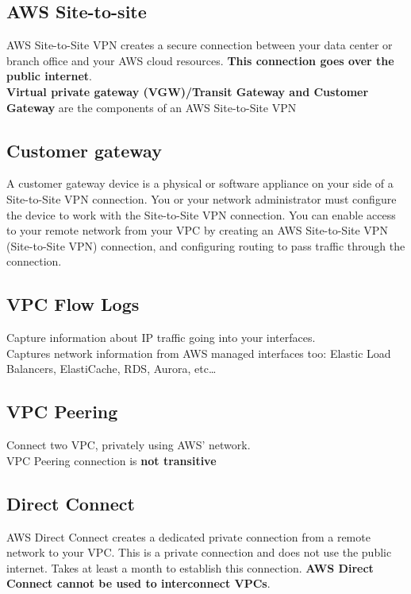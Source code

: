 \documentclass[12pt, letterpaper, twoside]{article}
\begin{document}
\subsection{AWS Site-to-site}
AWS Site-to-Site VPN creates a secure connection between your data center or branch office and your AWS cloud resources. 
\textbf{This connection goes over the public internet}.\\
\textbf{Virtual private gateway (VGW)/Transit Gateway and Customer Gateway} are the components of an AWS Site-to-Site VPN

\subsection{Customer gateway}
A customer gateway device is a physical or software appliance on your side of a Site-to-Site VPN connection. 
You or your network administrator must configure the device to work with the Site-to-Site VPN connection.
You can enable access to your remote network from your VPC by creating an AWS Site-to-Site VPN (Site-to-Site VPN) connection, 
and configuring routing to pass traffic through the connection.\\

\subsection{VPC Flow Logs}
Capture information about IP traffic going into your interfaces.\\
Captures network information from AWS managed interfaces too: Elastic Load
Balancers, ElastiCache, RDS, Aurora, etc…\\

\subsection{VPC Peering}
Connect two VPC, privately using AWS’ network.\\
VPC Peering connection is \textbf{not transitive}\\

\subsection{Direct Connect}
AWS Direct Connect creates a dedicated private connection from a remote network to your VPC. This is a private 
connection and does not use the public internet. Takes at least a month to establish this connection. 
\textbf{AWS Direct Connect cannot be used to interconnect VPCs}.
\end{document}
